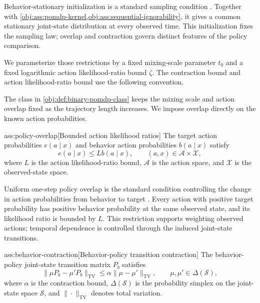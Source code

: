 \documentclass[11pt]{article}
\begin{document}
Behavior-stationary initialization is a standard sampling condition \citep{HuWager2023}. Together with \cref{obj:ass:pomdp-kernel,obj:ass:sequential-ignorability}, it gives a common stationary joint-state distribution at every observed time. This initialization fixes the sampling law; overlap and contraction govern distinct features of the policy comparison.

We parameterize those restrictions by a fixed mixing-scale parameter \(t_0\) and a fixed logarithmic action likelihood-ratio bound \(\zeta\). The contraction bound  and action likelihood-ratio bound  use the following convention.



The class in \cref{obj:def:binary-pomdp-class} keeps the mixing scale and action overlap fixed as the trajectory length increases. We impose overlap directly on the known action probabilities.

\begin{assumptionv}{ass:policy-overlap}[Bounded action likelihood ratios]
The target action probabilities \(e(a\mid x)\) and behavior action probabilities \(b(a\mid x)\) satisfy
\[
e(a\mid x)\le Lb(a\mid x),
\qquad (a,x)\in\mathcal A\times\mathcal X,
\]
where \(L\) is the action likelihood-ratio bound, \(\mathcal A\) is the action space, and \(\mathcal X\) is the observed-state space.
\end{assumptionv}

Uniform one-step policy overlap is the standard condition controlling the change in action probabilities from behavior to target \citep{HuWager2023}. Every action with positive target probability has positive behavior probability at the same observed state, and its likelihood ratio is bounded by \(L\). This restriction supports weighting observed actions; temporal dependence is controlled through the induced joint-state transitions.

\begin{assumptionv}{ass:behavior-contraction}[Behavior-policy transition contraction]
The behavior-policy joint-state transition matrix \(P_b\) satisfies
\[
\|\mu P_b-\mu'P_b\|_{\mathrm{TV}}
\le
\alpha\|\mu-\mu'\|_{\mathrm{TV}},
\qquad \mu,\mu'\in\Delta(\mathcal S),
\]
where \(\alpha\) is the contraction bound, \(\Delta(\mathcal S)\) is the probability simplex on the joint-state space \(\mathcal S\), and \(\|\cdot\|_{\mathrm{TV}}\) denotes total variation.
\end{assumptionv}
\end{document}

